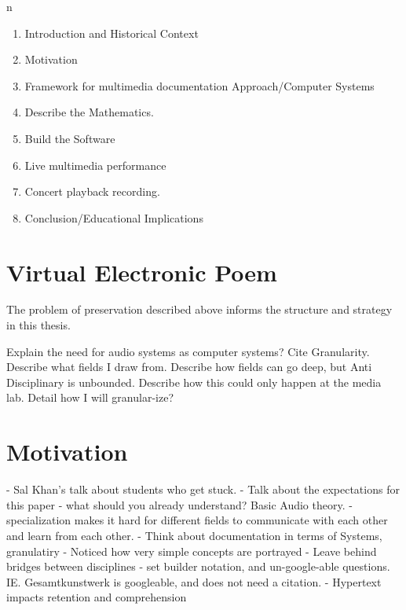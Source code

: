 n
\begin{enumerate}
\item Introduction and  Historical Context %
\item Motivation
\item Framework for multimedia documentation Approach/Computer Systems
\item Describe the Mathematics. %
\item Build the Software
\item Live multimedia performance
\item Concert playback recording. 
\item Conclusion/Educational Implications
\end{enumerate}


\section{Virtual Electronic Poem}
\label{sec:vep}



The problem of preservation described above informs the structure and
strategy in this thesis. 

Explain the need for audio systems as computer systems? Cite
Granularity. Describe what fields I draw from. Describe how fields can
go deep, but Anti Disciplinary is unbounded. Describe how this could
only happen at the media lab. Detail how I will granular-ize?

\section{Motivation}
\label{sec:motivation}

  - Sal Khan's talk about students who get stuck. 
  - Talk about the expectations for this paper - what should you
    already understand? Basic Audio theory. 
  - specialization makes it hard for different fields to communicate
  with each other and learn from each other.
  - Think about documentation in terms of Systems, granulatiry
  - Noticed how very simple concepts are portrayed 
  - Leave behind bridges between disciplines
  - set builder notation, and un-google-able
  questions. IE. Gesamtkunstwerk is googleable, and does not need a
  citation.
  - Hypertext impacts retention and comprehension

